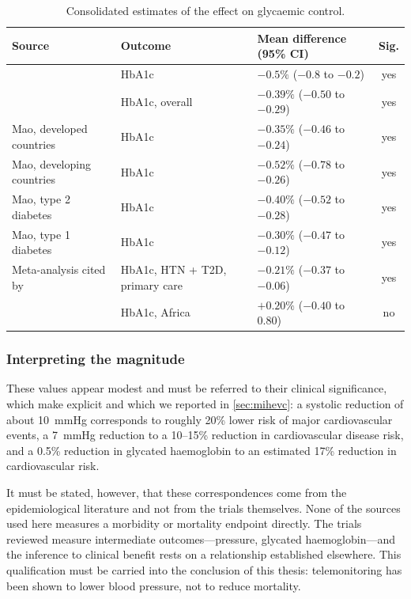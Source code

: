 \documentclass[12pt,a4paper,oneside]{report}
\begin{document}
\begin{table}[htbp]
\centering\footnotesize
\caption{Consolidated estimates of the effect on glycaemic control.}\label{tab:glyc-synthesis}
\begin{tabularx}{\textwidth}{@{}>{\raggedright\arraybackslash}p{3.6cm} >{\raggedright\arraybackslash}X >{\raggedright\arraybackslash}p{3.4cm} c@{}}
\toprule
\textbf{Source} & \textbf{Outcome} & \textbf{Mean difference (95\% CI)} & \textbf{Sig.} \\
\midrule
\textcite{mihevc2025} & HbA1c & $-0.5\%$ ($-0.8$ to $-0.2$) & yes \\
\textcite{mao2020} & HbA1c, overall & $-0.39\%$ ($-0.50$ to $-0.29$) & yes \\
Mao, developed countries & HbA1c & $-0.35\%$ ($-0.46$ to $-0.24$) & yes \\
Mao, developing countries & HbA1c & $-0.52\%$ ($-0.78$ to $-0.26$) & yes \\
Mao, type 2 diabetes & HbA1c & $-0.40\%$ ($-0.52$ to $-0.28$) & yes \\
Mao, type 1 diabetes & HbA1c & $-0.30\%$ ($-0.47$ to $-0.12$) & yes \\
Meta-analysis cited by \textcite{mihevc2025} & HbA1c, HTN + T2D, primary care & $-0.21\%$ ($-0.37$ to $-0.06$) & yes \\
\textcite{aovare2023} & HbA1c, Africa & $+0.20\%$ ($-0.40$ to $0.80$) & no \\
\bottomrule
\end{tabularx}
\end{table}

\subsubsection{Interpreting the magnitude}

These values appear modest and must be referred to their clinical significance, which \textcite{mihevc2025} make explicit and which we reported in \cref{sec:mihevc}: a systolic reduction of about 10~mmHg corresponds to roughly 20\% lower risk of major cardiovascular events, a 7~mmHg reduction to a 10--15\% reduction in cardiovascular disease risk, and a 0.5\% reduction in glycated haemoglobin to an estimated 17\% reduction in cardiovascular risk.

It must be stated, however, that these correspondences come from the epidemiological literature and not from the trials themselves. None of the sources used here measures a morbidity or mortality endpoint directly. The trials reviewed measure intermediate outcomes---pressure, glycated haemoglobin---and the inference to clinical benefit rests on a relationship established elsewhere. This qualification must be carried into the conclusion of this thesis: telemonitoring has been shown to lower blood pressure, not to reduce mortality.
\end{document}

